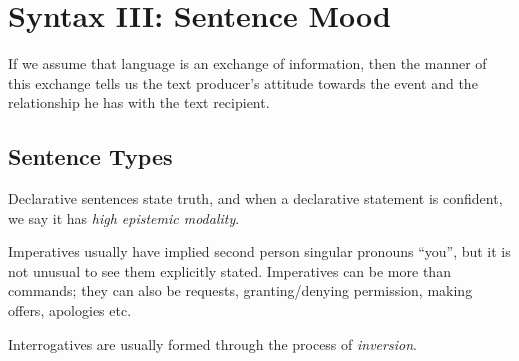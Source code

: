 \documentclass[../main.tex]{subfiles}
\begin{document}
	\chapter{Syntax III: Sentence Mood}
	\begin{preamb}
		If we assume that language is an exchange of information, then the manner of this exchange tells us the text producer's attitude towards the event and the relationship he has with the text recipient.
	\end{preamb}
	
	\section{Sentence Types}
		Declarative sentences state truth, and when a declarative statement is confident, we say it has \textit{high epistemic modality}.

		Imperatives usually have implied second person singular pronouns ``you'', but it is not unusual to see them explicitly stated.
		Imperatives can be more than commands; they can also be requests, granting/denying permission, making offers, apologies etc. 

		Interrogatives are usually formed through the process of \textit{inversion}.
\end{document}
